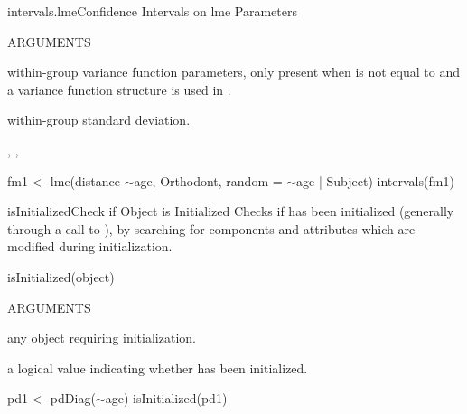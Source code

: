 \documentclass[pdftex]{article} \usepackage{url,graphicx}
\renewcommand{\Twiddle}{\mbox{\(\sim\)}}
\begin{document}
\begin{Helpfile}{intervals.lme}{Confidence Intervals on lme Parameters}
\begin{Argument}{ARGUMENTS}
\item[\Co{varFunc:}]
within-group variance function parameters, only
present when  is not equal to  and a
variance function structure is used in .
\item[\Co{sigma:}]
within-group standard deviation.
\end{Argument}
, ,
\need 15pt
\vspace{-16pt} 
\begin{Example}
fm1 <- lme(distance \Twiddle age, Orthodont, random = \Twiddle age | Subject)
intervals(fm1)
\end{Example}
\end{Helpfile}
\begin{Helpfile}{isInitialized}{Check if Object is Initialized}
Checks if  has been initialized (generally through a call
to ), by searching for components and attributes
which are modified during initialization.
\begin{Example}
isInitialized(object)
\end{Example}
\begin{Argument}{ARGUMENTS}
\item[\Co{object:}]
any object requiring initialization.
\end{Argument}
a logical value indicating whether  has been
initialized.
\need 15pt
\vspace{-16pt} 
\begin{Example}
pd1 <- pdDiag(\Twiddle age)
isInitialized(pd1)
\end{Example}
\end{Helpfile}
\end{document}
